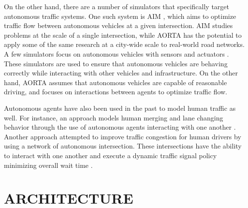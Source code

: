 \documentclass[letterpaper, 10 pt, conference]{ieeeconf}  %
\begin{document}
On the other hand, there are a number of simulators that specifically target autonomous traffic systems. One such system is AIM \cite{JAIR08-dresner}, which aims to optimize traffic flow between autonomous vehicles at a given intersection. AIM studies problems at the scale of a single intersection, while AORTA has the potential to apply some of the same research at a city-wide scale to real-world road networks. A few simulators focus on autonomous vehicles with sensors and actuators \cite{figueiredo2009approach}. These simulators are used to ensure that autonomous vehicles are behaving correctly while interacting with other vehicles and infrastructure. On the other hand, AORTA assumes that autonomous vehicles are capable of reasonable driving, and focuses on interactions between agents to optimize traffic flow. 

Autonomous agents have also been used in the past to model human traffic as well. For instance, an approach models human merging and lane changing behavior through the use of autonomous agents interacting with one another \cite{hidas2002modelling}. Another approach attempted to improve traffic congestion for human drivers by using a network of autonomous intersection. These intersections have the ability to interact with one another and execute a dynamic traffic signal policy minimizing overall wait time \cite{manikonda2001autonomous}.




\section{ARCHITECTURE}

\end{document}
